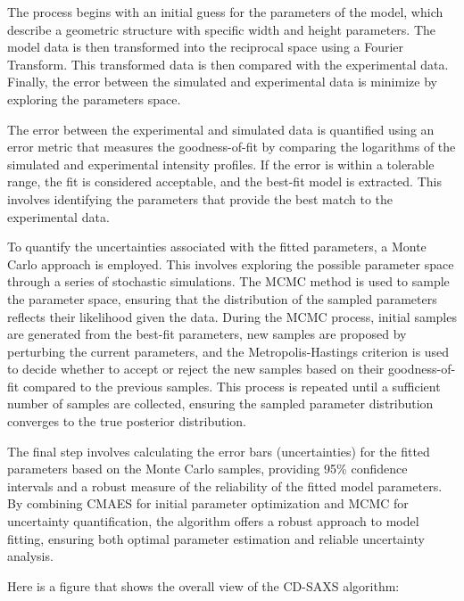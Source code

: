The process begins with an initial guess for the parameters of the model, which describe a geometric structure with specific width and height parameters. The model data is then transformed into the reciprocal space using a Fourier Transform.
This transformed data is then compared with the experimental data. Finally, the error between the simulated and experimental data is minimize by exploring the parameters space.

\medskip

The error between the experimental and simulated data is quantified using an error metric that measures the goodness-of-fit by comparing the logarithms of the simulated and experimental intensity profiles. If the error is within a tolerable range, the fit is considered acceptable, and the best-fit model is extracted. This involves identifying the parameters that provide the best match to the experimental data.

\medskip

To quantify the uncertainties associated with the fitted parameters, a Monte Carlo approach is employed. This involves exploring the possible parameter space through a series of stochastic simulations. The MCMC method is used to sample the parameter space, ensuring that the distribution of the sampled parameters reflects their likelihood given the data. During the MCMC process, initial samples are generated from the best-fit parameters, new samples are proposed by perturbing the current parameters, and the Metropolis-Hastings criterion is used to decide whether to accept or reject the new samples based on their goodness-of-fit compared to the previous samples. This process is repeated until a sufficient number of samples are collected, ensuring the sampled parameter distribution converges to the true posterior distribution.

\medskip

The final step involves calculating the error bars (uncertainties) for the fitted parameters based on the Monte Carlo samples, providing 95\% confidence intervals and a robust measure of the reliability of the fitted model parameters. By combining CMAES for initial parameter optimization and MCMC for uncertainty quantification, the algorithm offers a robust approach to model fitting, ensuring both optimal parameter estimation and reliable uncertainty analysis.

\medskip

Here is a figure that shows the overall view of the CD-SAXS algorithm:

